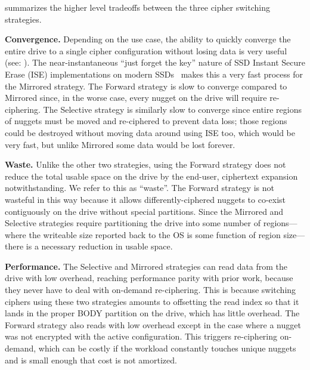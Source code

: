 %




 summarizes the higher level tradeoffs between the
three cipher switching strategies.

\textbf{Convergence.} Depending on the use case, the ability to quickly converge
the entire drive to a single cipher configuration without losing data is very
useful (see: ). The near-instantaneous ``just forget the key''
nature of SSD Instant Secure Erase (ISE) implementations on modern
SSDs~\cite{ISE1,ISE2,ISE3} makes this a very fast process for the Mirrored
strategy. The Forward strategy is slow to converge compared to Mirrored since,
in the worse case, every nugget on the drive will require re-ciphering. The
Selective strategy is similarly slow to converge since entire regions of nuggets
must be moved and re-ciphered to prevent data loss; those regions could be
destroyed without moving data around using ISE too, which would be very fast,
but unlike Mirrored some data would be lost forever.

\textbf{Waste.} Unlike the other two strategies, using the Forward strategy does
not reduce the total usable space on the drive by the end-user, ciphertext
expansion notwithstanding. We refer to this as ``waste''. The Forward strategy
is not wasteful in this way because it allows differently-ciphered nuggets to
co-exist contiguously on the drive without special partitions. Since the
Mirrored and Selective strategies require partitioning the drive into some
number of regions---where the writeable size reported back to the OS is some
function of region size---there is a necessary reduction in usable space.

\textbf{Performance.} The Selective and Mirrored strategies can read data from
the drive with low overhead, reaching performance parity with prior work,
because they never have to deal with on-demand re-ciphering. This is because
switching ciphers using these two strategies amounts to offsetting the read
index so that it lands in the proper BODY partition on the drive, which has
little overhead. The Forward strategy also reads with low overhead except in the
case where a nugget was not encrypted with the active configuration. This
triggers re-ciphering on-demand, which can be costly if the workload constantly
touches unique nuggets and is small enough that cost is not amortized.


